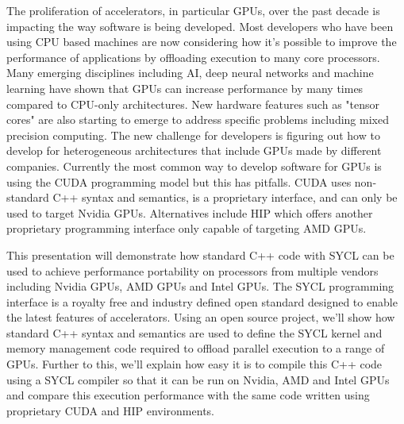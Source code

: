 The proliferation of accelerators, in particular GPUs, over the past decade is impacting the way software is being developed. Most developers who have been using CPU based machines are now considering how it's possible to improve the performance of applications by offloading execution to many core processors. Many emerging disciplines including AI, deep neural networks and machine learning have shown that GPUs can increase performance by many times compared to CPU-only architectures. New hardware features such as "tensor cores" are also starting to emerge to address specific problems including mixed precision computing. The new challenge for developers is figuring out how to develop for heterogeneous architectures that include GPUs made by different companies. Currently the most common way to develop software for GPUs is using the CUDA programming model but this has pitfalls. CUDA uses non-standard C++ syntax and semantics, is a proprietary interface, and can only be used to target Nvidia GPUs. Alternatives include HIP which offers another proprietary programming interface only capable of targeting AMD GPUs.

This presentation will demonstrate how standard C++ code with SYCL can be used to achieve performance portability on processors from multiple vendors including Nvidia GPUs, AMD GPUs and Intel GPUs. The SYCL programming interface is a royalty free and industry defined open standard designed to enable the latest features of accelerators. Using an open source project, we'll show how standard C++ syntax and semantics are used to define the SYCL kernel and memory management code required to offload parallel execution to a range of GPUs. Further to this, we'll explain how easy it is to compile this C++ code using a SYCL compiler so that it can be run on Nvidia, AMD and Intel GPUs and compare this execution performance with the same code written using proprietary CUDA and HIP environments. 